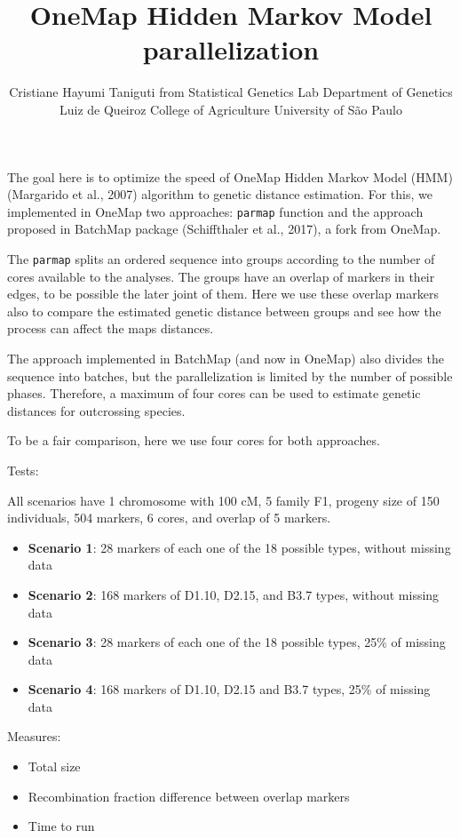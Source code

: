\documentclass[]{article}
\title{OneMap Hidden Markov Model parallelization}
\author{Cristiane Hayumi Taniguti from Statistical Genetics Lab Department of
Genetics Luiz de Queiroz College of Agriculture University of São Paulo}
\date{}
\providecommand{\tightlist}{%
  \setlength{\itemsep}{0pt}\setlength{\parskip}{0pt}}
\begin{document}
\maketitle

The goal here is to optimize the speed of OneMap Hidden Markov Model
(HMM) (Margarido et al., 2007) algorithm to genetic distance estimation.
For this, we implemented in OneMap two approaches: \texttt{parmap}
function and the approach proposed in BatchMap package (Schiffthaler et
al., 2017), a fork from OneMap.

The \texttt{parmap} splits an ordered sequence into groups according to
the number of cores available to the analyses. The groups have an
overlap of markers in their edges, to be possible the later joint of
them. Here we use these overlap markers also to compare the estimated
genetic distance between groups and see how the process can affect the
maps distances.

The approach implemented in BatchMap (and now in OneMap) also divides
the sequence into batches, but the parallelization is limited by the
number of possible phases. Therefore, a maximum of four cores can be
used to estimate genetic distances for outcrossing species.

To be a fair comparison, here we use four cores for both approaches.

Tests:

All scenarios have 1 chromosome with 100 cM, 5 family F1, progeny size
of 150 individuals, 504 markers, 6 cores, and overlap of 5 markers.

\begin{itemize}
\tightlist
\item
  \textbf{Scenario 1}: 28 markers of each one of the 18 possible types,
  without missing data
\item
  \textbf{Scenario 2}: 168 markers of D1.10, D2.15, and B3.7 types,
  without missing data
\item
  \textbf{Scenario 3}: 28 markers of each one of the 18 possible types,
  25\% of missing data
\item
  \textbf{Scenario 4}: 168 markers of D1.10, D2.15 and B3.7 types, 25\%
  of missing data
\end{itemize}

Measures:

\begin{itemize}
\tightlist
\item
  Total size
\item
  Recombination fraction difference between overlap markers
\item
  Time to run
\end{itemize}
\end{document}
